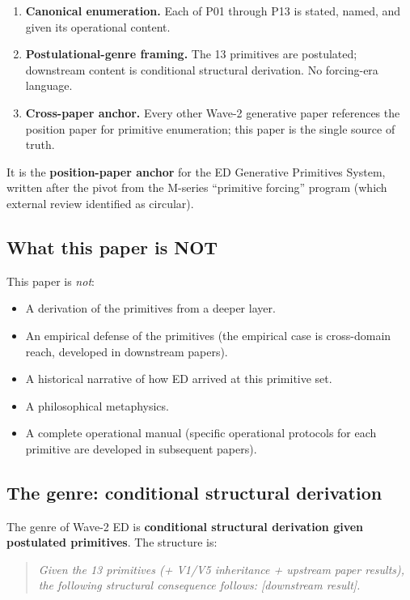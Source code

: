 \documentclass[11pt,a4paper]{article}
\begin{document}
\begin{enumerate}[noitemsep]
\item \textbf{Canonical enumeration.} Each of P01 through P13 is stated, named, and given its operational content.
\item \textbf{Postulational-genre framing.} The 13 primitives are postulated; downstream content is conditional structural derivation. No forcing-era language.
\item \textbf{Cross-paper anchor.} Every other Wave-2 generative paper references the position paper for primitive enumeration; this paper is the single source of truth.
\end{enumerate}

It is the \textbf{position-paper anchor} for the ED Generative Primitives System, written after the pivot from the M-series ``primitive forcing'' program (which external review identified as circular).

\subsection{What this paper is NOT}

This paper is \emph{not}:

\begin{itemize}[noitemsep]
\item A derivation of the primitives from a deeper layer.
\item An empirical defense of the primitives (the empirical case is cross-domain reach, developed in downstream papers).
\item A historical narrative of how ED arrived at this primitive set.
\item A philosophical metaphysics.
\item A complete operational manual (specific operational protocols for each primitive are developed in subsequent papers).
\end{itemize}

\subsection{The genre: conditional structural derivation}

The genre of Wave-2 ED is \textbf{conditional structural derivation given postulated primitives}. The structure is:

\begin{quote}
\emph{Given the 13 primitives (+ V1/V5 inheritance + upstream paper results), the following structural consequence follows: [downstream result].}
\end{quote}
\end{document}

